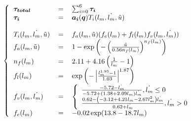 \documentclass[pdftex,a4paper,11pt]{article}
\newcommand{\vs}[1]{\boldsymbol{#1}} %
\numberwithin{equation}{subsection}
\begin{document}
\[
\left\{
\begin{tabular}{lcl}
    $\vs{\tau_{total}}$ & = & $\sum_{i = 0}^{6} \vs{\tau_i}$ \\
    $\vs{\tau_i}$ & = & $\vs{a_i}(\vs{q}) T_i(l_m, \dot{l_m}, \tilde{u})$ \\
    \\
    $T_i(l_m, \dot{l_m}, \tilde{u})$ & = & $f_a(l_m, \tilde{u})(f_e(l_m) + f_l(l_m) f_v(l_m, \dot{l_m}))$ \\
    $f_a(l_m, \tilde{u})$          & = & $1 - \exp \left(- \left(\frac{\tilde{u}}{0.56 n_f(l_m)}\right)^{n_f(l_m)}\right)$ \\
    $n_f(l_m)$                     & = & $2.11 + 4.16 \left(\frac{1}{l_m} - 1\right)$ \\
    $f_l(l_m)$                     & = & $\exp \left(-\left|\frac{l_m^{1.93} - 1}{1.03}\right|^{1.87}\right)$ \\
    $f_v(l_m, \dot{l_m})$          & = & 
        $\left\{ 
        \begin{array}{l}
            \frac{-5.72 - \dot{l_m}}{-5.72 + (1.38 + 2.09 l_m) \dot{l_m}}, \dot{l_m} \leq 0 \\
            \frac{0.62 - \left(-3.12 + 4.21 l_m - 2.67 l_m^2\right) \dot{l_m}}{0.62 + \dot{l_m}}, \dot{l_m} > 0 \\
        \end{array}
        \right.$ \\
    $f_e(l_m)$                     & = & $-0.02 \exp(13.8 - 18.7 l_m)$ \\
\end{tabular}
\right.
\]

\begin{figure}[h]
    \centering
    ~~~
    ~~~
\end{figure}
\end{document}
